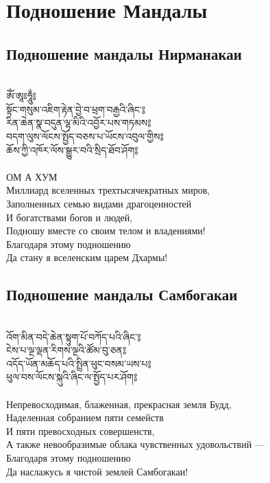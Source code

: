 \section{Подношение Мандалы}

\subsection{Подношение мандалы Нирманакаи}
\\
\ti
ཨོཾ་ཨཱཿཧཱུྂ༔ \\
སྟོང་གསུམ་འཇིག་རྟེན་བྱེ་བ་ཕྲག་བརྒྱའི་ཞིང་༔\\
རིན་ཆེན་སྣ་བདུན་ལྷ་མིའི་འབྱོར་པས་གཏམས༔ \\
བདག་ལུས་ལོངས་སྤྱོད་བཅས་པ་ཡོངས་འབུལ་གྱིས༔ \\
ཆོས་ཀྱི་འཁོར་ལོས་སྒྱུར་བའི་སྲིད་ཐོབ་ཤོག༔ \\
\\
\ru
ОМ А ХУМ\\
Миллиард вселенных трехтысячекратных миров,\\
Заполненных семью видами драгоценностей\\
И богатствами богов и людей,\\
Подношу вместе со своим телом и владениями!\\
Благодаря этому подношению\\
Да стану я вселенским царем Дхармы!\\

\subsection{Подношение мандалы Самбогакаи}
\\
\ti
འོག་མིན་བདེ་ཆེན་སྟུག་པོ་བཀོད་པའི་ཞིང་༔ \\
ངེས་པ་ལྔ་ལྡན་རིགས་ལྔའི་ཚོམ་བུ་ཅན༔  \\
འདོད་ཡོན་མཆོད་པའི་སྤྲིན་ཕུང་བསམ་ཡས་པ༔ \\
ཕུལ་བས་ལོངས་སྐུའི་ཞིང་ལ་སྤྱོད་པར་ཤོག༔ \\
\\
\ru
Непревосходимая, блаженная, прекрасная земля Будд,\\
Наделенная собранием пяти семейств\\
И пяти превосходных совершенств,\\
А также невообразимые облака чувственных удовольствий —\\
Благодаря этому подношению\\
Да наслажусь я чистой землей Самбогакаи!

\newpage
